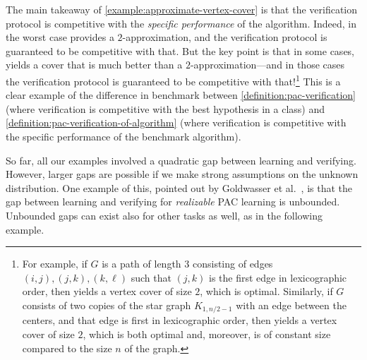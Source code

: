 \documentclass{toc}
\begin{document}
The main takeaway of \cref{example:approximate-vertex-cover} is that the verification protocol is competitive with the \emph{specific performance} of the algorithm. Indeed, in the worst case  provides a {$2$-approximation}, and the verification protocol is guaranteed to be competitive with that. But the key point is that in some cases,  yields a cover that is much better than a {$2$-approximation}---and in those cases the verification protocol is guaranteed to be competitive with that!\footnote{%
	For example, if $G$ is a path of length $3$ consisting of edges $(i,j), (j,k), (k,\ell)$ such that $(j,k)$ is the first edge in lexicographic order, then  yields a vertex cover of size $2$, which is optimal. Similarly, if $G$ consists of two copies of the star graph $K_{1,n/2-1}$ with an edge between the centers, and that edge is first in lexicographic order, then  yields a vertex cover of size $2$, which is both optimal and, moreover, is of constant size compared to the size $n$ of the graph.%
} This is a clear example of the difference in benchmark between \cref{definition:pac-verification} (where verification is competitive with the best hypothesis in a class) and \cref{definition:pac-verification-of-algorithm} (where verification is competitive with the specific performance of the benchmark algorithm).

So far, all our examples involved a quadratic gap between learning and verifying. However, larger gaps are possible if we make strong assumptions on the unknown distribution. One example of this, pointed out by Goldwasser et al.\ \cite{GoldwasserRSY21}, is that the gap between learning and verifying for \emph{realizable} PAC learning is unbounded. Unbounded gaps can exist also for other tasks as well, as in the following example.
\end{document}
